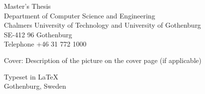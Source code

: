 {Master's Thesis \the\year\\	%
Department of Computer Science and Engineering\\
Chalmers University of Technology and University of Gothenburg\\
SE-412 96 Gothenburg\\
Telephone +46 31 772 1000 \setlength{\parskip}{0.5cm}

\vfill
Cover: Description of the picture on the cover page (if applicable)


Typeset in \LaTeX \\
Gothenburg, Sweden \the\year

}